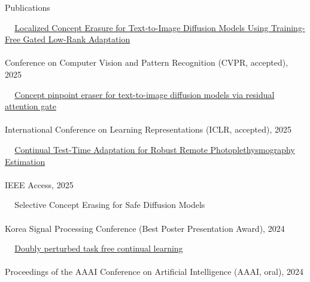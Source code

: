 \documentclass{resume} %
\newcommand{\mycolor}[1]{\textcolor{myurlcolor}{#1}}
\begin{document}
\begin{rSection}{Publications}

\textbullet~\,\, \href{https://arxiv.org/abs/2503.12356}{Localized Concept Erasure for Text-to-Image Diffusion Models Using Training-Free Gated Low-Rank Adaptation}
\\ 
\\ \hspace*{1.5em}Conference on Computer Vision and Pattern Recognition (CVPR, accepted), 2025


\textbullet~\,\, \href{https://arxiv.org/abs/2312.13027}{Concept pinpoint eraser for text-to-image diffusion models via residual attention gate}
\\ 
\\ \hspace*{1.5em}International Conference on Learning Representations (ICLR, accepted), 2025



\textbullet~\,\, \href{https://ieeexplore.ieee.org/document/10938539}{Continual Test-Time Adaptation for Robust Remote Photoplethysmography Estimation}
\\ 
\\ \hspace*{1.5em}IEEE Access, 2025



\textbullet~\,\, {\mycolor{Selective Concept Erasing for Safe Diffusion Models}}
\\ 
\\ \hspace*{1.5em}Korea Signal Processing Conference (Best Poster Presentation Award), 2024

\textbullet~\,\, \href{https://arxiv.org/abs/2312.13027}{Doubly perturbed task free continual learning}
\\ 
\\ \hspace*{1.5em}Proceedings of the AAAI Conference on Artificial Intelligence (AAAI, oral), 2024



\end{rSection}
\end{document}
